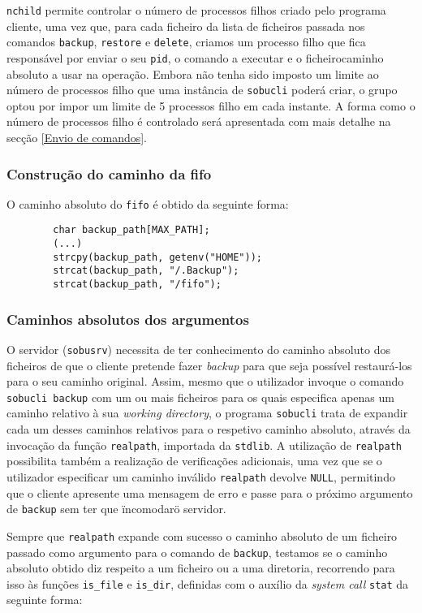 \documentclass[a4paper,12pt,titlepage,draft,portuguese]{article}
\begin{document}
\texttt{nchild} permite controlar o número de processos filhos criado pelo programa cliente, uma vez que, para cada ficheiro da lista de ficheiros passada nos comandos \texttt{backup}, \texttt{restore} e \texttt{delete}, criamos um processo filho que fica responsável por enviar o seu \texttt{pid}, o comando a executar e o ficheiro\/caminho absoluto a usar na operação. Embora não tenha sido imposto um limite ao número de processos filho que uma instância de \texttt{sobucli} poderá criar, o grupo optou por impor um limite de 5 processos filho em cada instante. A forma como o número de processos filho é controlado será apresentada com mais detalhe na secção \ref{Envio de comandos}.

\subsubsection{Construção do caminho da fifo}

O caminho absoluto do \texttt{fifo} é obtido da seguinte forma:
	\begin{verbatim}
		char backup_path[MAX_PATH];
		(...)
		strcpy(backup_path, getenv("HOME"));
		strcat(backup_path, "/.Backup");
		strcat(backup_path, "/fifo");
	\end{verbatim}

\subsubsection{Caminhos absolutos dos argumentos}

O servidor (\texttt{sobusrv}) necessita de ter conhecimento do caminho absoluto dos ficheiros de que o cliente pretende fazer \emph{backup} para que seja possível restaurá-los para o seu caminho original. Assim, mesmo que o utilizador invoque o comando \texttt{sobucli backup} com um ou mais ficheiros para os quais especifica apenas um caminho relativo à sua \emph{working directory}, o programa \texttt{sobucli} trata de expandir cada um desses caminhos relativos para o respetivo caminho absoluto, através da invocação da função \texttt{realpath}, importada da \texttt{stdlib}. A utilização de \texttt{realpath} possibilita também a realização de verificações adicionais, uma vez que se o utilizador especificar um caminho inválido \texttt{realpath} devolve \texttt{NULL}, permitindo que o cliente apresente uma mensagem de erro e passe para o próximo argumento de \texttt{backup} sem ter que \"incomodar\" o servidor.

Sempre que \texttt{realpath} expande com sucesso o caminho absoluto de um ficheiro passado como argumento para o comando de \texttt{backup}, testamos se o caminho absoluto obtido diz respeito a um ficheiro ou a uma diretoria, recorrendo para isso às funções \texttt{is\_file} e \texttt{is\_dir}, definidas com o auxílio da \emph{system call} \texttt{stat} da seguinte forma:
\end{document}
